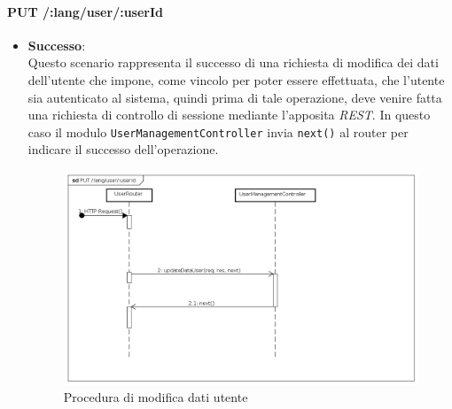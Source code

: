 \paragraph{PUT /:lang/user/:userId}
\begin{itemize}
\item \textbf{Successo}:
\\
Questo scenario rappresenta il successo di una richiesta di modifica dei dati dell'utente che impone, come vincolo per poter essere effettuata, che l'utente sia autenticato al sistema, quindi prima di tale operazione, deve venire fatta una richiesta di controllo di sessione mediante l'apposita \textit{REST}. 
In questo caso il modulo \texttt{UserManagementController} invia \texttt{next()} al router per indicare il successo dell'operazione.
\label{Procedura di modifica dati utente}
\begin{figure}[ht]
	\centering
	\includegraphics[scale=0.40]{UML/DiagrammiDiSequenza/Back-end/PUT_LangUserUseridSuccess.png}
	\caption{Procedura di modifica dati utente}
\end{figure}
\FloatBarrier


\end{itemize}
